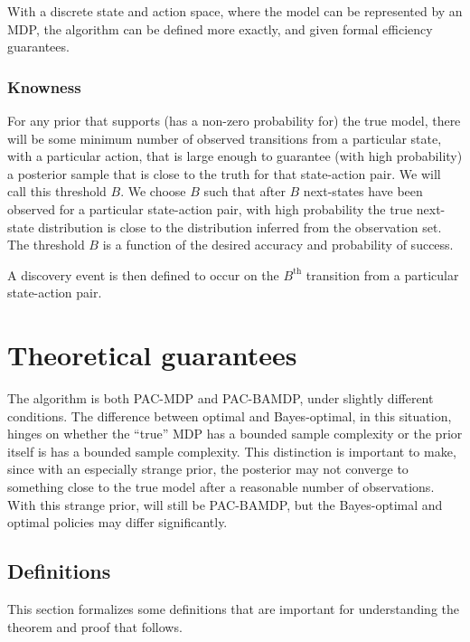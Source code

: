 With a discrete state and action space, where the model can be represented by an MDP, the  algorithm can be defined more exactly, and given formal efficiency guarantees.

\subsubsection{Knowness}

For any prior that supports (has a non-zero probability for) the true model, there will be some minimum number of observed transitions from a particular state, with a particular action, that is large enough to guarantee (with high probability) a posterior sample that is close to the truth for that state-action pair. We will call this threshold $B$. We choose $B$ such that after $B$ next-states have been observed for a particular state-action pair, with high probability the true next-state distribution is close to the distribution inferred from the observation set. The threshold $B$ is a function of the desired accuracy and probability of success.

A discovery event is then defined to occur on the $B^{\mbox{th}}$ transition from a particular state-action pair.

\section{Theoretical guarantees}

The  algorithm is both PAC-MDP and PAC-BAMDP, under slightly different conditions. The difference between optimal and Bayes-optimal, in this situation, hinges on whether the ``true'' MDP has a bounded sample complexity or the prior itself is has a bounded sample complexity. This distinction is important to make, since with an especially strange prior, the posterior may not converge to something close to the true model after a reasonable number of observations. With this strange prior,  will still be PAC-BAMDP, but the Bayes-optimal and optimal policies may differ significantly.

\subsection{Definitions}

This section formalizes some definitions that are important for understanding the theorem and proof that follows.

